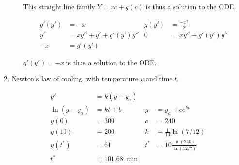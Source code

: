 \begin{enumerate}
\begin{enumerate}
                    This straight line family $ Y = xc + g(c) $ is thus a solution to the ODE.

                    \begin{align}
                        g'(y') & = -x                   & g(y') & = \frac{-x^{2}}{2} \\
                        y'     & = xy'' + y' +g'(y')y'' & 0     & = xy'' + g'(y')y'' \\
                        -x     & = g'(y')
                    \end{align}

                    $g'(y') = -x$ is thus a solution to the ODE.
          \end{enumerate}

    \item Newton's law of cooling, with temperature $ y $ and time $ t $,

          \begin{align}
              y'              & = k(y - y_{a})                                               \\
              \ln (y - y_{a}) & = kt + b            & y     & = y_{a} + ce^{kt}              \\
              y(0)            & = 300               & c     & = 240                          \\
              y(10)           & = 200               & k     & = \frac{1}{10} \ln (7/12)      \\
              y(t^{*})        & = 61                & t^{*} & = 10\frac{\ln(240)}{\ln(12/7)} \\
              t^{*}           & = \SI{101.68}{\min}
          \end{align}

          \begin{figure}[H]
              \centering
          \end{figure}


\end{enumerate}
